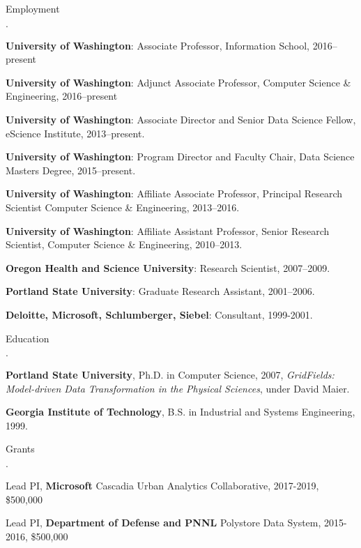 \documentclass[10pt]{article}
\newcommand{\ptitle}{\em}
\newenvironment{bulletlist}
   {
      \begin{list}
         {$\cdot$}
         {
            \setlength{\itemsep}{.7ex}
            \setlength{\parsep}{0ex}
            \setlength{\leftmargin}{0.7em}
            \setlength{\parskip}{0ex}
            \setlength{\topsep}{0ex}
         }
   }
   {
      \end{list}
   }
\newcommand{\marginlabel}[1]{
\begin{minipage}[b]{0.8\labelwidth}{\large \textsf{\textbf{#1}}}\end{minipage}}
\newcommand{\entrylabel}[1]{\mbox{\marginlabel{#1}}\hfill}
\newcommand{\MainListlabel}[1]
   {
      \parbox[t]{\labelwidth}{\hspace{.8em}\marginlabel{#1}}
   }
\newenvironment{MainList}[1]
   {
      \renewcommand{\entrylabel}{\MainListlabel}
      \begin{list}{}
      {
         \renewcommand{\makelabel}{\entrylabel}
         \setlength   {\itemindent}{-.65em}
         \setlength   {\labelwidth}{#1}
         \setlength   {\leftmargin}{\labelwidth}
         \setlength   {\itemsep}{3ex}
      }
   }
   {
      \end{list}
   }
\begin{document}
\begin{MainList}{88pt}

\item [Employment]
\begin{bulletlist}
\item {\bf University of Washington}: Associate Professor, Information School, 2016--present
\item {\bf University of Washington}: Adjunct Associate Professor, Computer Science \& Engineering, 2016--present
\item {\bf University of Washington}: Associate Director and Senior Data Science Fellow, eScience Institute, 2013--present.
\item {\bf University of Washington}: Program Director and Faculty Chair, Data Science Masters Degree, 2015--present.
\item {\bf University of Washington}: Affiliate Associate Professor, Principal Research Scientist
Computer Science \& Engineering, 2013--2016.
\item {\bf University of Washington}: Affiliate Assistant Professor, Senior Research Scientist,
Computer Science \& Engineering, 2010--2013.
\item {\bf Oregon Health and Science University}: Research Scientist, 2007--2009.
\item {\bf Portland State University}: Graduate Research Assistant, 2001--2006.
\item {\bf Deloitte, Microsoft, Schlumberger, Siebel}: Consultant, 1999-2001.

\end{bulletlist}

\item [Education]
\begin{bulletlist}
\item {\bf Portland State University},
      Ph.D. in Computer Science, 2007,
{\ptitle GridFields: Model-driven Data Transformation in the Physical Sciences},
under David Maier.
\item {\bf Georgia Institute of Technology},
     B.S. in Industrial and Systems Engineering, 1999.
\end{bulletlist}

\item [Grants]
\begin{bulletlist}

\item Lead PI, {\bf Microsoft} Cascadia Urban Analytics Collaborative, 2017-2019, \$500,000

\item Lead PI, {\bf Department of Defense and PNNL} Polystore Data System, 2015-2016, \$500,000


\end{bulletlist}
\end{MainList}
\end{document}
